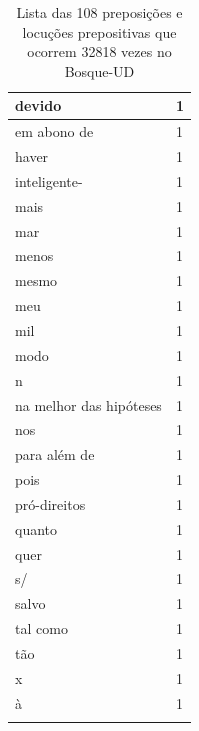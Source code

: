 \documentclass[output=paper,colorlinks,citecolor=brown]{langscibook}
\begin{document}
\begin{longtable}{ | p{3cm} | p{2cm} | }
		devido & 1\\\hline
		em abono de & 1\\\hline
		haver & 1\\\hline
		inteligente- & 1\\\hline
		mais & 1\\\hline
		mar & 1\\\hline
		menos & 1\\\hline
		mesmo & 1\\\hline
		meu & 1\\\hline
		mil & 1\\\hline
		modo & 1\\\hline
		n & 1\\\hline
		na melhor das hipóteses & 1\\\hline
		nos & 1\\\hline
		para além de & 1\\\hline
		pois & 1\\\hline
		pró-direitos & 1\\\hline
		quanto & 1\\\hline
		quer & 1\\\hline
		s/ & 1\\\hline
		salvo & 1\\\hline
		tal como & 1\\\hline
		tão & 1\\\hline
		x & 1\\\hline
		à & 1\\\hline
		\caption{Lista das 108 preposições e locuções prepositivas que ocorrem 32818 vezes no Bosque-UD}
		\label{tab:adp}
	\end{longtable}
\end{document}
